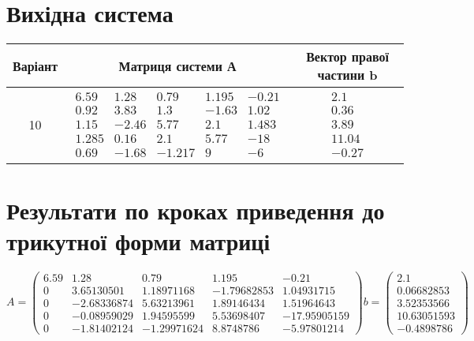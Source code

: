\documentclass{article}
\begin{document}
    \section{Вихідна система}
    \begin{tabular}{ |c|c|c| }
        \hline
        Варіант & Матриця системи А & Вектор правої частини b \\ 
        \hline
        10
        &
        $\begin{matrix}
            6.59 & 1.28 & 0.79 & 1.195 & -0.21\\
            0.92 & 3.83 & 1.3 & -1.63 & 1.02\\
            1.15 & -2.46 & 5.77 & 2.1 & 1.483\\
            1.285 & 0.16 & 2.1 & 5.77 & -18\\
            0.69 & -1.68 & -1.217 & 9 & -6
        \end{matrix}$
        &
        $\begin{matrix}
            2.1\\
            0.36\\
            3.89\\
            11.04\\
            -0.27
        \end{matrix}$
        \\ 
        \hline
    \end{tabular}

    \section{Результати по кроках приведення до трикутної форми матриці}
    $$ A =
\left(    \begin{matrix}
        6.59 & 1.28 & 0.79 & 1.195 & -0.21\\
        0 & 3.65130501 & 1.18971168 & -1.79682853 & 1.04931715\\
        0 & -2.68336874 & 5.63213961 & 1.89146434 & 1.51964643\\
        0 & -0.08959029 & 1.94595599 & 5.53698407 & -17.95905159\\
        0 & -1.81402124 & -1.29971624 & 8.8748786 & -5.97801214
    \end{matrix}\right)
    b = 
\left(    \begin{matrix}
        2.1       \\
        0.06682853\\
        3.52353566\\
        10.63051593\\
        -0.4898786
    \end{matrix}\right)
   $$
\end{document}
